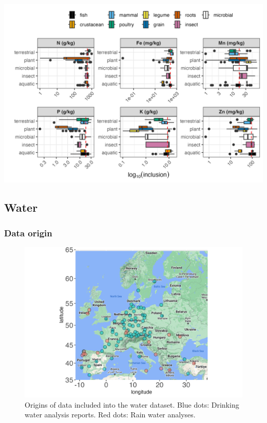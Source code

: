 \documentclass[
]{article}
\begin{document}
\includegraphics[width=27.08in]{../output/plots/feedstuff_composition}

\hypertarget{water-1}{%
\subsection{Water}\label{water-1}}

\hypertarget{data-origin}{%
\subsubsection{Data origin}\label{data-origin}}

\begin{figure}
\includegraphics[width=27.08in]{../output/plots/map} \caption{Origins of data included into the water dataset. Blue dots: Drinking water analysis reports. Red dots: Rain water analyses.}\label{fig:unnamed-chunk-16}
\end{figure}
\end{document}

